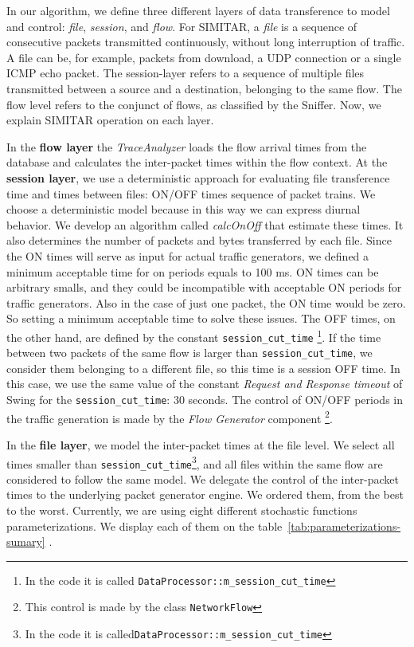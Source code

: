 In our algorithm, we define three different layers of data transference to model and control: \textit{file}, \textit{session}, and \textit{flow}. For SIMITAR, a \textit{file} is a sequence of consecutive packets transmitted continuously, without long interruption of traffic. A file can be, for example, packets from download, a UDP   connection or a single ICMP echo packet. The session-layer refers to a sequence of multiple files transmitted between a source and a destination, belonging to the same flow.  The flow level refers to the conjunct of flows, as classified by the Sniffer.  Now, we explain SIMITAR operation on each layer. 


In the \textbf{flow layer} the \textit{TraceAnalyzer} loads the flow arrival times from the database and calculates the inter-packet times within the flow context. At the \textbf{session layer}, we use a deterministic approach for evaluating file transference time and times between files: ON/OFF times sequence of packet trains. We choose a deterministic model because in this way we can express diurnal behavior\cite{harpoon-paper}.  We develop an algorithm called \textit{calcOnOff} that estimate these times. It also determines the number of packets and bytes transferred by each file. Since the ON times will serve as input for actual traffic generators, we defined a minimum acceptable time for on periods equals to 100 ms. ON times can be arbitrary smalls, and they could be incompatible with acceptable ON periods for traffic generators. Also in the case of just one packet, the ON time would be zero. So setting a minimum acceptable time to solve these issues. The OFF times, on the other hand, are defined by the constant \texttt{session\_cut\_time} \footnote{In the code it is called \texttt{DataProcessor::m\_session\_cut\_time} }. If the time between two packets of the same flow is larger than \texttt{session\_cut\_time}, we consider them belonging to a different file, so this time is a session OFF time. In this case, we use the same value of the constant \textit{Request and Response timeout} of Swing\cite{swing-paper} for the \texttt{session\_cut\_time}: 30 seconds. The control of ON/OFF periods in the traffic generation is made by the \textit{Flow Generator} component \footnote{This control is made by the class \texttt{NetworkFlow}}.


In the \textbf{file layer}, we model the inter-packet times at the file level. We select all times smaller than \texttt{session\_cut\_time}\footnote{In the code it is called\texttt{DataProcessor::m\_session\_cut\_time} }, and all files within the same flow are considered to follow the same model. We delegate the control of the inter-packet times to the underlying packet generator engine. We ordered them, from the best to the worst. Currently, we are using eight different stochastic functions parameterizations. We display each of them on the table~\ref{tab:parameterizations-sumary} .


